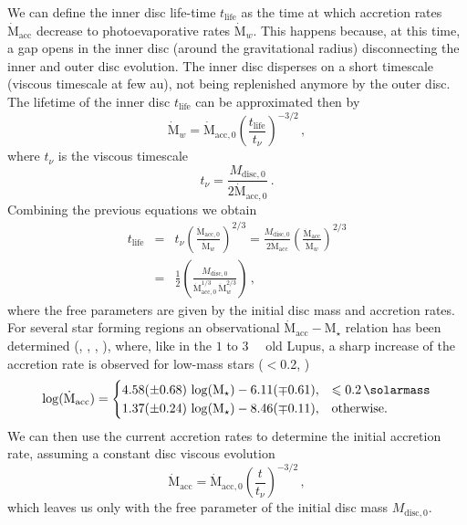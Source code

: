 \documentclass[usenatbib,useAMS,usedcolumn]{mnras}
\begin{document}
We can define the inner disc life-time $t_\mathrm{life}$ as the time at which accretion rates $\dot{\mathrm{M}}_\mathrm{acc}$ decrease to photoevaporative rates $\dot{\mathrm{M}}_w$.
This happens because, at this time, a gap opens in the inner disc (around the gravitational radius) disconnecting the inner and outer disc evolution. 
The inner disc disperses on a short timescale (viscous timescale at few \si{\astronomicalunit}), not being replenished anymore by the outer disc.
The lifetime of the inner disc $t_\mathrm{life}$ can be approximated then by
\begin{equation}\label{eq:tlifedef}
    \dot{\mathrm{M}}_w = \dot{\mathrm{M}}_\mathrm{acc,0}\left(\frac{t_\mathrm{life}}{t_\nu}\right)^{-3/2}\, ,
\end{equation}
where $t_\nu$ is the viscous timescale
\begin{equation}
    t_\nu = \frac{M_\mathrm{disc,0}}{2 \dot{\mathrm{M}}_\mathrm{acc,0}}\, .
\end{equation}
Combining the previous equations we obtain
\begin{eqnarray}\label{eq:tlife}
    t_\mathrm{life} &=& t_\nu \left(\frac{\dot{\mathrm{M}}_\mathrm{acc,0}}{\dot{\mathrm{M}}_w}\right)^{2/3} = \frac{M_\mathrm{disc,0}}{2 \dot{\mathrm{M}}_\mathrm{acc}}\left(\frac{\dot{\mathrm{M}}_\mathrm{acc}}{\dot{\mathrm{M}}_w}\right)^{2/3} \nonumber \\
    &=& \frac{1}{2}\left(\frac{M_\mathrm{disc,0}}{\dot{\mathrm{M}}_\mathrm{acc,0}^{1/3}\,\dot{\mathrm{M}}_w^{2/3}}\right)\, ,
\end{eqnarray}
where the free parameters are given by the initial disc mass and accretion rates.
For several star forming regions an observational $\dot{\mathrm{M}}_\mathrm{acc}-\mathrm{M}_\star$ relation has been determined (, , , ), where, like in the $1$ to \SI{3}{\mega\year} old Lupus, a sharp increase of the accretion rate is observed for low-mass stars ($<$\SI{0.2}{\solarmass}, )
\begin{equation}\label{eq:mdotAlcala}
    \log(\dot{\mathrm{M}}_\mathrm{acc}) = 
    \begin{cases}
      4.58 (\pm 0.68) \, \log(\mathrm{M}_\star) - 6.11(\mp 0.61), & \leq \SI{0.2}{\solarmass} \\
      1.37 (\pm 0.24) \, \log(\mathrm{M}_\star) - 8.46 (\mp 0.11), & \text{otherwise.}
    \end{cases}
\end{equation}
We can then use the current accretion rates to determine the initial accretion rate, assuming a constant disc viscous evolution
\begin{equation}\label{eq:mdot0}
    \dot{\mathrm{M}}_\mathrm{acc} = \dot{\mathrm{M}}_\mathrm{acc,0} \left(\frac{t}{t_\nu}\right)^{-3/2}\,,
\end{equation}
which leaves us only with the free parameter of the initial disc mass $M_\mathrm{disc,0}$.
\end{document}
